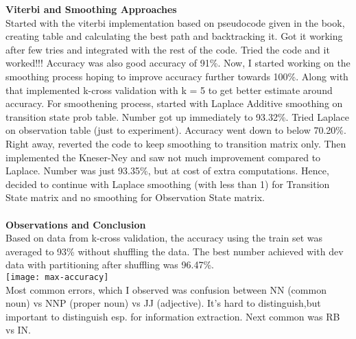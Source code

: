 \documentclass[addpoints,12pt]{exam}
\begin{document}
\textbf{Viterbi and Smoothing Approaches}\\
Started with the viterbi implementation based on pseudocode given in the book, creating table and calculating the best path and backtracking it. Got it working after few tries and integrated with the rest of the code. Tried the code and it worked!!! Accuracy was also good accuracy of 91\%. Now, I started working on the smoothing process hoping to improve accuracy further towards 100\%. Along with that implemented k-cross validation with k = 5 to get better estimate around accuracy. For smoothening process, started with Laplace Additive smoothing on transition state prob table. Number got up immediately to 93.32\%. Tried Laplace on observation table (just to experiment). Accuracy went down to below 70.20\%. Right away, reverted the code to keep smoothing to transition matrix only. Then implemented the Kneser-Ney and saw not much improvement compared to Laplace. Number was just 93.35\%, but at cost of extra computations. Hence, decided to continue with Laplace smoothing (with less than 1) for Transition State matrix and no smoothing for Observation State matrix.\\ \\
\textbf{Observations and Conclusion}\\
Based on data from k-cross validation, the accuracy using the train set was averaged to 93\% without shuffling the data. The best number achieved with dev data with partitioning after shuffling was 96.47\%.\\
\texttt{[image: max-accuracy]}
\\
Most common errors, which I observed was confusion between NN (common noun) vs NNP  (proper noun) vs JJ (adjective). It's hard to distinguish,but important to distinguish esp. for information extraction. Next common was RB vs IN.\\
\end{document}
